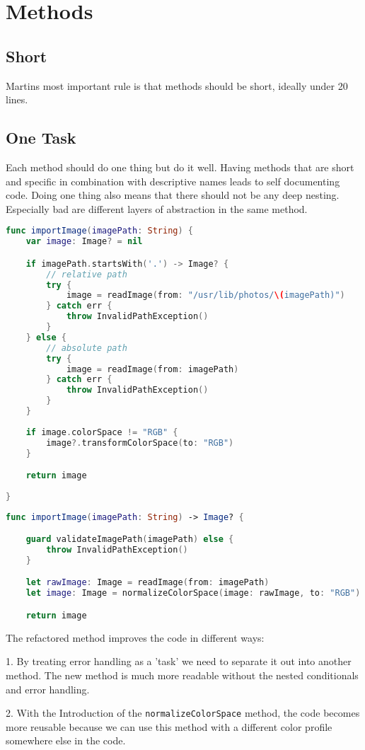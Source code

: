 \section{Methods}

\subsection{Short}
Martins most important rule is that methods should be short, ideally under 20 lines.

\subsection{One Task}
Each method should do one thing but do it well. Having methods that are short and specific in combination with descriptive names leads to self documenting code. Doing one thing also means that there should not be any deep nesting. Especially bad are different layers of abstraction in the same method.

\begin{lstlisting}[language=Swift, caption={Method with more than one task}]
func importImage(imagePath: String) {
    var image: Image? = nil

    if imagePath.startsWith('.') -> Image? {
        // relative path
        try {
            image = readImage(from: "/usr/lib/photos/\(imagePath)")
        } catch err {
            throw InvalidPathException()
        }
    } else {
        // absolute path
        try {
            image = readImage(from: imagePath)
        } catch err {
            throw InvalidPathException()
        }
    }
    
    if image.colorSpace != "RGB" {
        image?.transformColorSpace(to: "RGB")
    }

    return image
    
}
\end{lstlisting}


\begin{lstlisting}[language=Swift, caption={Refactored method that only does one thing: import an image}]
func importImage(imagePath: String) -> Image? {

    guard validateImagePath(imagePath) else {
        throw InvalidPathException()
    }

    let rawImage: Image = readImage(from: imagePath)
    let image: Image = normalizeColorSpace(image: rawImage, to: "RGB")

    return image

\end{lstlisting}

The refactored method improves the code in different ways:

1. By treating error handling as a 'task' we need to separate it out into another method. The new method is much more readable without the nested conditionals and error handling.

2. With the Introduction of the \texttt{normalizeColorSpace} method, the code becomes more reusable because we can use this method with a different color profile somewhere else in the code.
